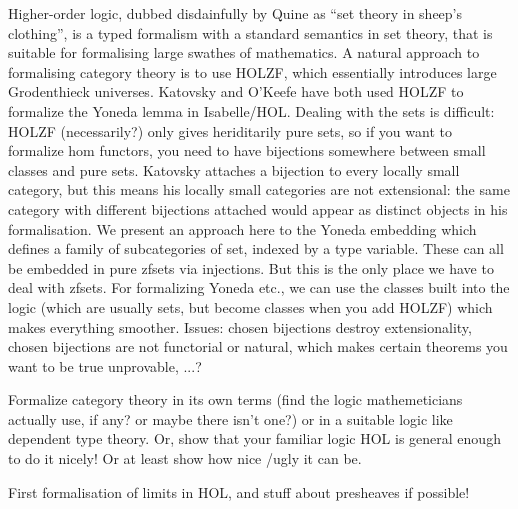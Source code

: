 \documentclass{article}
\begin{document}
Higher-order logic, dubbed disdainfully by Quine as ``set theory in sheep's clothing'', is a typed formalism with a standard semantics in set theory, that is suitable for formalising large swathes of mathematics.
A natural approach to formalising category theory is to use HOLZF, which essentially introduces large Grodenthieck universes.
Katovsky and O'Keefe have both used HOLZF to formalize the Yoneda lemma in Isabelle/HOL.
Dealing with the sets is difficult: HOLZF (necessarily?) only gives heriditarily pure sets, so if you want to formalize hom functors, you need to have bijections somewhere between small classes and pure sets.
Katovsky attaches a bijection to every locally small category, but this means his locally small categories are not extensional: the same category with different bijections attached would appear as distinct objects in his formalisation.
We present an approach here to the Yoneda embedding which defines a family of subcategories of set, indexed by a type variable.
These can all be embedded in pure zfsets via injections.
But this is the only place we have to deal with zfsets.
For formalizing Yoneda etc., we can use the classes built into the logic (which are usually sets, but become classes when you add HOLZF) which makes everything smoother.
Issues: chosen bijections destroy extensionality, chosen bijections are not functorial or natural, which makes certain theorems you want to be true unprovable, ...?

Formalize category theory in its own terms (find the logic mathemeticians actually use, if any? or maybe there isn't one?) or in a suitable logic like dependent type theory. Or, show that your familiar logic HOL is general enough to do it nicely! Or at least show how nice /ugly it can be.

First formalisation of limits in HOL, and stuff about presheaves if possible!
\end{document}
